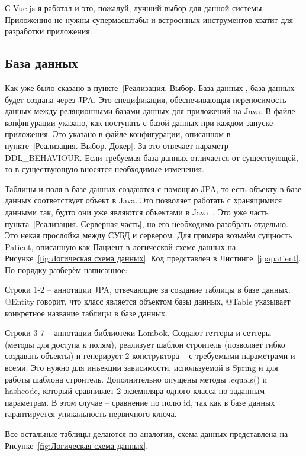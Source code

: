 \documentclass[a4paper,article]{article}
\begin{document}
    С Vue.js я работал и это, пожалуй, лучший выбор для данной системы. Приложению не нужны супермасштабы и встроенных инструментов хватит для разработки приложения.

    \subsection{База данных}\label{Реализация. База данных}

    Как уже было сказано в пункте~\ref{Реализация. Выбор. База данных}, база данных будет создана через JPA. Это спецификация, обеспечивающая переносимость данных между реляционными базами данных для приложений на Java. В файле конфигурации указано, как поступать с базой данных при каждом запуске приложения. Это указано в файле конфигурации, описанном в пункте~\ref{Реализация. Выбор. Докер}. За это отвечает параметр {DDL\_BEHAVIOUR}. Если требуемая база данных отличается от существующей, то в существующую вносятся необходимые изменения.

    Таблицы и поля в базе данных создаются с помощью JPA, то есть объекту в базе данных соответствует объект в Java. Это позволяет работать с хранящимися данными так, будто они уже являются объектами в Java~\cite{baeldungbook}. Это уже часть пункта~\ref{Реализация. Серверная часть}, но его необходимо разобрать отдельно. Это некая прослойка между СУБД и сервером. Для примера возьмём сущность Patient, описанную как Пациент в логической схеме данных на Рисунке~\ref{fig:Логическая схема данных}. Код представлен в Листинге~\ref{jpapatient}. По порядку разберём написанное:

    Строки 1-2 -- аннотации JPA, отвечающие за создание таблицы в базе данных. @Entity говорит, что класс является объектом базы данных, @Table указывает конкретное название таблицы в базе данных.

    Строки 3-7 -- аннотации библиотеки Lombok. Создают геттеры и сеттеры (методы для доступа к полям), реализует шаблон строитель (позволяет гибко создавать объекты) и генерирует 2 конструктора -- с требуемыми параметрами и всеми. Это нужно для инъекции зависимости, используемой в Spring и для работы шаблона строитель. Дополнительно опущены методы .equals() и hashcode, который сравнивает 2 экземпляра одного класса по заданным параметрам. В этом случае -- сравнение по полю id, так как в базе данных гарантируется уникальность первичного ключа.

    Все остальные таблицы делаются по аналогии, схема данных представлена на Рисунке~\ref{fig:Логическая схема данных}.
\end{document}
